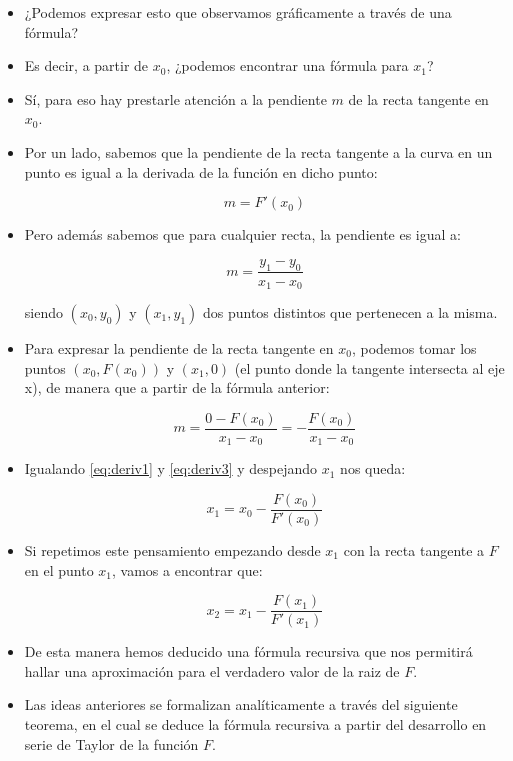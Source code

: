 \documentclass[openany]{book}
\begin{document}
\begin{itemize}
\item
  ¿Podemos expresar esto que observamos gráficamente a través de una fórmula?
\item
  Es decir, a partir de \(x_0\), ¿podemos encontrar una fórmula para \(x_1\)?
\item
  Sí, para eso hay prestarle atención a la pendiente \(m\) de la recta tangente en \(x_0\).
\item
  Por un lado, sabemos que la pendiente de la recta tangente a la curva en un punto es igual a la derivada de la función en dicho punto:

  \begin{equation}
    m = F'(x_0)
    \label{eq:deriv1}
    \end{equation}
\item
  Pero además sabemos que para cualquier recta, la pendiente es igual a:

  \begin{equation}
    m = \frac{y_1 - y_0}{x_1 - x_0}
    \label{eq:deriv2}
    \end{equation}

  siendo \((x_0, y_0)\) y \((x_1, y_1)\) dos puntos distintos que pertenecen a la misma.
\item
  Para expresar la pendiente de la recta tangente en \(x_0\), podemos tomar los puntos \((x_0, F(x_0))\) y \((x_1, 0)\) (el punto donde la tangente intersecta al eje x), de manera que a partir de la fórmula anterior:

  \begin{equation}
    m = \frac{0 - F(x_0)}{x_1 - x_0} = - \frac{F(x_0)}{x_1 - x_0}
    \label{eq:deriv3}
    \end{equation}
\item
  Igualando \eqref{eq:deriv1} y \eqref{eq:deriv3} y despejando \(x_1\) nos queda:

  \begin{equation}
    x_1 = x_0 - \frac{F(x_0)}{F'(x_0)}
    \label{eq:deriv4}
    \end{equation}
\item
  Si repetimos este pensamiento empezando desde \(x_1\) con la recta tangente a \(F\) en el punto \(x_1\), vamos a encontrar que:

  \begin{equation}
    x_2 = x_1 - \frac{F(x_1)}{F'(x_1)}
    \label{eq:deriv5}
    \end{equation}
\item
  De esta manera hemos deducido una fórmula recursiva que nos permitirá hallar una aproximación para el verdadero valor de la raiz de \(F\).
\item
  Las ideas anteriores se formalizan analíticamente a través del siguiente teorema, en el cual se deduce la fórmula recursiva a partir del desarrollo en serie de Taylor de la función \(F\).
\end{itemize}
\end{document}
